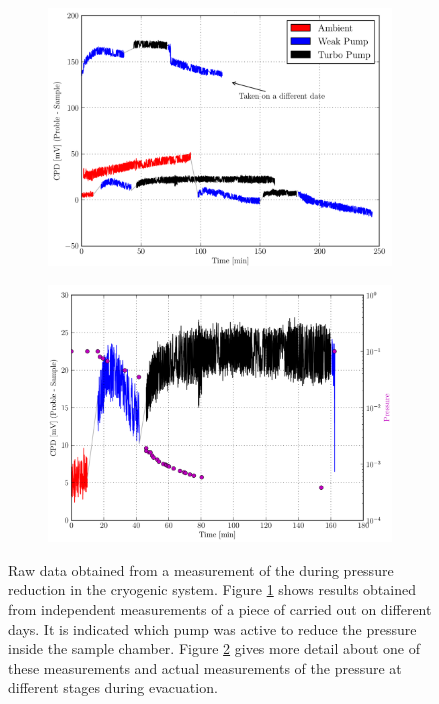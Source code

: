 \begin{figure}
\begin{subfigure}{0.5\textwidth}
\centering
	\includegraphics[width=0.95\linewidth]{./figs/chap2/HOPGMcA}
	\caption{}
	\label{fig:hopg-p1}
\end{subfigure}
\begin{subfigure}{0.5\textwidth}
\centering
	\includegraphics[width=0.95\linewidth]{./figs/chap2/HOPGMcAPres}
	\caption{}
	\label{fig:hopg-p2}
\end{subfigure}
\caption{Raw data obtained from a measurement of the \cpd{} during pressure reduction in the \McA cryogenic system. Figure \ref{fig:hopg-p1} shows results obtained from independent measurements of a piece of \hopg{} carried out on different days. It is indicated which pump was active to reduce the pressure inside the sample chamber. Figure \ref{fig:hopg-p2} gives more detail about one of these measurements and actual measurements of the pressure at different stages during evacuation.}
\label{fig:hopg-p}
\end{figure}
